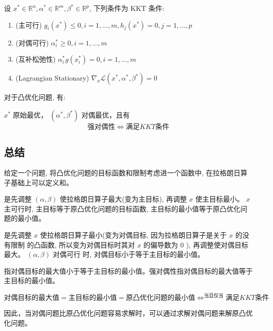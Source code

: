 \begin{theorem}
    设 $ x^{*} \in \mathbb{R}^{n}, \alpha^{*} \in \mathbb{R}^{m}, \beta^{*} \in \mathbb{R}^{p} $, 下列条件为 $ \mathrm{KKT} $ 条件:

    \begin{enumerate}
        \item (主可行) $ g_{i}\left(x^{*}\right) \leqslant 0, i=1, \ldots, m, h_{j}\left(x^{*}\right)=0, j=1, \ldots, p $
        \item (对偶可行) $ \alpha_{i}^{*} \geqslant 0, i=1, \ldots, m $
        \item (互补松弛性) $ \alpha_{i}^{*} g\left(x_{i}^{*}\right)=0, i=1, \ldots, m $
        \item (Lagrangian Stationary) $ \nabla_{x} \mathcal{L}\left(x^{*}, \alpha^{*}, \beta^{*}\right)=0 $
    \end{enumerate}

\end{theorem}

\begin{theorem}
    对于凸优化问题, 有:

$ x^{*} $ 原始最优， $ \left(\alpha^{*}, \beta^{*}\right) $ 对偶最优，且有$$ 强对偶性 \Leftrightarrow  满足  K K T  条件$$
\end{theorem}

\subsection{总结}


给定一个问题, 将凸优化问题的目标函数和限制考虑进一个函数中, 在拉格朗日算子基础上可以定义和。

是先调整 $ (\alpha, \beta) $ 使拉格朗日算子最大(变为主目标), 再调整 $ x $ 使主目标最小。 $ x $ 主可行时, 主目标等于原凸优化问题的目标函数, 主目标的最小值等于原凸优化问题的最小值。

是先调整 $ x $ 使拉格朗日算子最小(变为对偶目标, 因为拉格朗日算子是关于 $ x $ 的没有限制 的凸函数, 所以变为对偶目标时其对 $ x $ 的偏导数为 0 ), 再调整使对偶目标最大。 $ (\alpha, \beta) $ 对偶可行 时, 对偶目标小于等于主目标的最小值。

指对偶目标的最大值小于等于主目标的最小值。强对偶性指对偶目标的最大值等于主目标的最小值。

$$对偶目标的最大值=主目标的最小值=原凸优化问题的最小值 \Leftrightarrow^{当且仅当}满足KKT条件$$

因此，当对偶问题比原凸优化问题容易求解时，可以通过求解对偶问题来解原凸优化问题。


